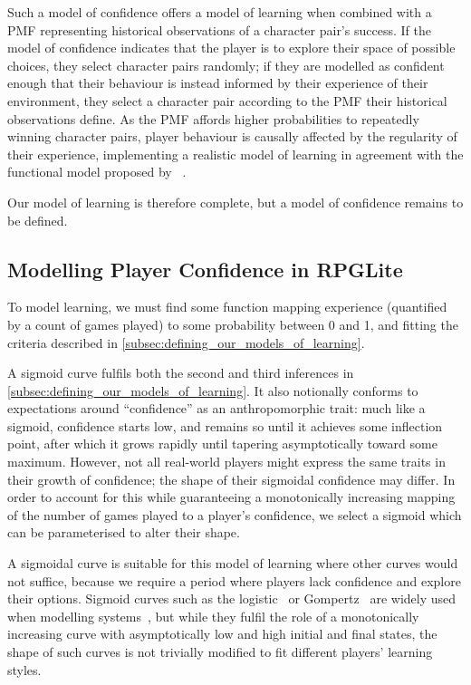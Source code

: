 Such a model of confidence offers a model of learning when combined with a PMF representing historical
observations of a character pair's success.
If the model of confidence indicates that the player is to explore their space of possible choices, they
select character pairs randomly; if they are modelled as confident enough that
their behaviour is instead informed by their experience of their environment,
they select a character pair according to the PMF their historical observations define.
As the PMF affords higher probabilities to repeatedly winning character pairs, player behaviour
is causally affected by the regularity of their experience, implementing a realistic model of learning
in agreement with the functional model proposed by \citeauthor{lachman1997learning}~\cite{lachman1997learning}.

Our model of learning is therefore complete, but a model of confidence remains to be defined.

\subsection{Modelling Player Confidence in RPGLite}\label{subsec:confidence_model}

To model learning, we must find some function mapping experience (quantified by a count of games played) to
some probability between 0 and 1, and fitting the criteria described in \cref{subsec:defining_our_models_of_learning}.

A sigmoid curve fulfils both the second and third inferences in \cref{subsec:defining_our_models_of_learning}.
It also notionally conforms to expectations
around ``confidence'' as an anthropomorphic trait: much like a sigmoid, confidence starts low, and remains so until
it achieves some inflection point, after which it grows rapidly until tapering asymptotically toward some maximum.
However, not all real-world players might express the same traits in their growth of confidence; the shape
of their sigmoidal confidence may differ. In order to account for this while guaranteeing a monotonically
increasing mapping of the number of games played to a player's confidence, we select a sigmoid which can
be parameterised to alter their shape.

A sigmoidal curve is suitable for this model of learning where other curves would not suffice, because we
require a period where players lack confidence and explore their options. Sigmoid curves such as
the logistic~\cite{verhulst1845loi} or Gompertz~\cite{gompertz1815curve} are widely used when modelling
systems~\cite{werker1997modelling}, but while they fulfil the role of a monotonically increasing curve
with asymptotically low and high initial and final states, the shape of such curves is not trivially modified
to fit different players' learning styles.

